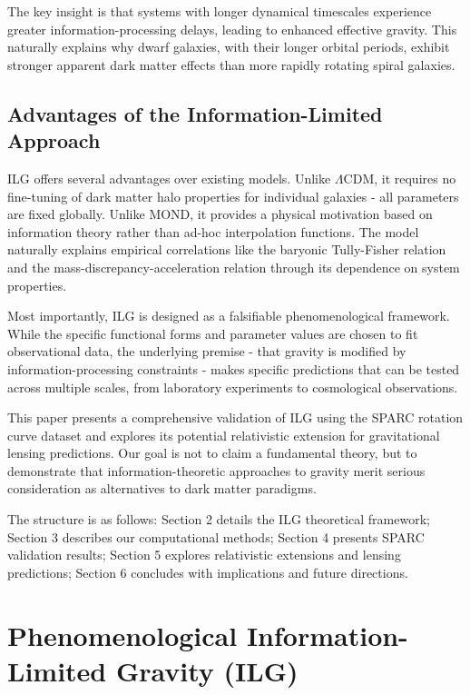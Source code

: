 \documentclass[12pt,a4paper]{article}
\begin{document}
The key insight is that systems with longer dynamical timescales experience greater information-processing delays, leading to enhanced effective gravity. This naturally explains why dwarf galaxies, with their longer orbital periods, exhibit stronger apparent dark matter effects than more rapidly rotating spiral galaxies.

\subsection{Advantages of the Information-Limited Approach}

ILG offers several advantages over existing models. Unlike $\Lambda$CDM, it requires no fine-tuning of dark matter halo properties for individual galaxies - all parameters are fixed globally. Unlike MOND, it provides a physical motivation based on information theory rather than ad-hoc interpolation functions. The model naturally explains empirical correlations like the baryonic Tully-Fisher relation and the mass-discrepancy-acceleration relation through its dependence on system properties.

Most importantly, ILG is designed as a falsifiable phenomenological framework. While the specific functional forms and parameter values are chosen to fit observational data, the underlying premise - that gravity is modified by information-processing constraints - makes specific predictions that can be tested across multiple scales, from laboratory experiments to cosmological observations.

This paper presents a comprehensive validation of ILG using the SPARC rotation curve dataset and explores its potential relativistic extension for gravitational lensing predictions. Our goal is not to claim a fundamental theory, but to demonstrate that information-theoretic approaches to gravity merit serious consideration as alternatives to dark matter paradigms.

The structure is as follows: Section 2 details the ILG theoretical framework; Section 3 describes our computational methods; Section 4 presents SPARC validation results; Section 5 explores relativistic extensions and lensing predictions; Section 6 concludes with implications and future directions.


\section{Phenomenological Information-Limited Gravity (ILG)}
\end{document}
